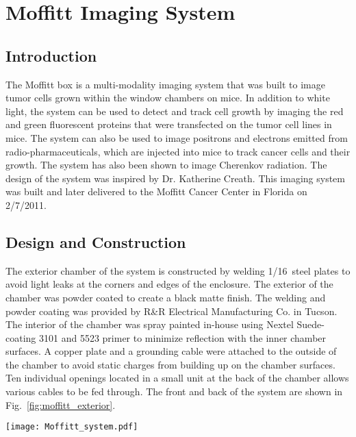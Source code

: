 \chapter{Moffitt Imaging System}\label{app:moffitt}
\section{Introduction}
The Moffitt box is a multi-modality imaging system that was built to image tumor cells grown within the window chambers on mice.  In addition to white light, the system can be used to detect and track cell growth by imaging the red and green fluorescent proteins that were transfected on the tumor cell lines in mice.  The system can also be used to image positrons and electrons emitted from radio-pharmaceuticals, which are injected into mice to track cancer cells and their growth.  The system has also been shown to image Cherenkov radiation.  The design of the system was inspired by Dr. Katherine Creath.  This imaging system was built and later delivered to the Moffitt Cancer Center in Florida on 2/7/2011.

\section{Design and Construction}
The exterior chamber of the system is constructed by welding 1/16\inches~steel plates to avoid light leaks at the corners and edges of the enclosure. The exterior of the chamber was powder coated to create a black matte finish.  The welding and powder coating was provided by R\&R  Electrical Manufacturing Co. in Tucson.  The interior of the chamber was spray painted in-house using Nextel Suede-coating 3101 and 5523 primer to minimize reflection with the inner chamber surfaces.  A copper plate and a grounding cable were attached to the outside of the chamber to avoid static charges from building up on the chamber surfaces.  Ten individual openings located in a small unit at the back of the chamber allows various cables to be fed through.  The front and back of the system are shown in Fig.~\ref{fig:moffitt_exterior}.

\begin{sidewaysfigure*}
	\centering
	\texttt{[image: Moffitt\_system.pdf]}
	\caption{The (a) front and (b) back of the Moffitt imaging system.}
	\label{fig:moffitt_exterior}
\end{sidewaysfigure*}

